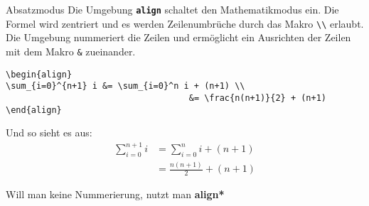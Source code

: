 \begin{frame}[fragile]{Absatzmodus}
Die Umgebung \textbf{\texttt{align}} schaltet den Mathematikmodus ein. Die Formel wird zentriert und es werden Zeilenumbrüche durch das Makro \texttt{\textbackslash\textbackslash} erlaubt. Die Umgebung nummeriert die Zeilen und ermöglicht ein Ausrichten der Zeilen mit dem Makro \texttt{\&} zueinander. 
\begin{lstlisting}[style=tex]
\begin{align}
\sum_{i=0}^{n+1} i &= \sum_{i=0}^n i + (n+1) \\
                                    &= \frac{n(n+1)}{2} + (n+1)
\end{align}
\end{lstlisting}

Und so sieht es aus:
\begin{align}
\sum_{i=0}^{n+1} i &= \sum_{i=0}^n i + (n+1) \\
                       &= \frac{n(n+1)}{2} + (n+1)
\end{align}%

Will man keine Nummerierung, nutzt man \textbf{align*}
\end{frame}




